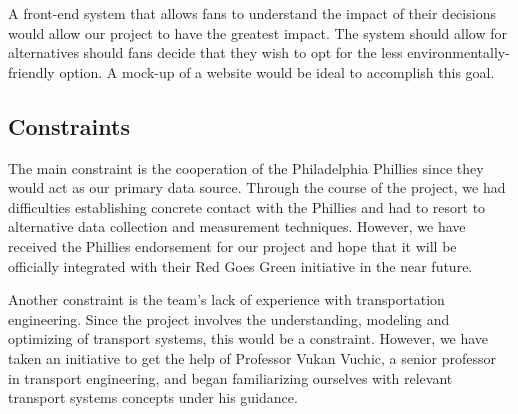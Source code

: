 A front-end system that allows fans to understand the impact of their
decisions would allow our project to have the greatest impact. The
system should allow for alternatives should fans decide that they wish
to opt for the less environmentally-friendly option. A mock-up of a
website would be ideal to accomplish this goal.

\subsection{Constraints}
The main constraint is the cooperation of the Philadelphia Phillies
since they would act as our primary data source. Through the course of
the project, we had difficulties establishing concrete contact with
the Phillies and had to resort to alternative data collection and
measurement techniques. However, we have received the Phillies
endorsement for our project and hope that it will be officially
integrated with their Red Goes Green initiative in the near future.

Another constraint is the team’s lack of experience with
transportation engineering. Since the project involves the
understanding, modeling and optimizing of transport systems, this
would be a constraint. However, we have taken an initiative to get the
help of Professor Vukan Vuchic, a senior professor in transport
engineering, and began familiarizing ourselves with relevant transport
systems concepts under his guidance.

